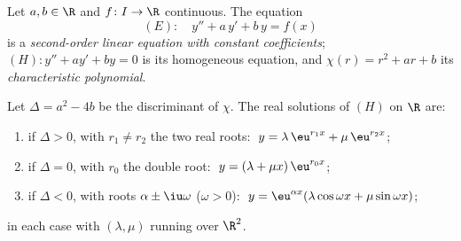 \begin{definition}\label{def:b1:diffeq:linear2}
Let $a, b \in \R$ and $f \colon I \to \R$ continuous. The equation
\[
(E)\colon\quad y'' + a\,y' + b\,y = f(x)
\]
is a \emph{second-order linear equation with constant
coefficients};
$(H)\colon y'' + ay' + by = 0$ is its homogeneous equation, and
$\chi(r) = r^2 + ar + b$ its \emph{characteristic
polynomial}.
\end{definition}

\begin{theorem}\label{thm:b1:diffeq:homogeneous2}
Let $\Delta = a^2 - 4b$ be the discriminant of $\chi$. The real
solutions of $(H)$ on $\R$ are:
\begin{enumerate}
  \item if $\Delta > 0$, with $r_1 \neq r_2$ the two real roots:
        $\;y = \lambda\, \eu^{r_1 x} + \mu\, \eu^{r_2 x}$;
  \item if $\Delta = 0$, with $r_0$ the double root:
        $\;y = (\lambda + \mu x)\, \eu^{r_0 x}$;
  \item if $\Delta < 0$, with roots $\alpha \pm \iu\omega$
        ($\omega > 0$):
        $\;y = \eu^{\alpha x} (\lambda \cos\omega x + \mu
        \sin\omega x)$;
\end{enumerate}
in each case with $(\lambda, \mu)$ running over $\R^2$.
\end{theorem}

